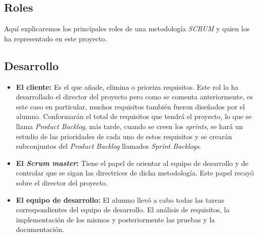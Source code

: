 \subsection*{Roles}
Aquí explicaremos los principales roles de una metodología \textit{SCRUM} y quien los ha representado en este proyecto.
\subsection*{Desarrollo}
\begin{itemize}
\item \textbf{El cliente:} Es el que añade, elimina o prioriza requisitos. Este rol lo ha desarrollado el director del proyecto pero como se comenta anteriormente, es este caso en particular, muchos requisitos también fueron diseñados por el alumno.
Conformarán el total de requisitos que tendrá el proyecto, lo que se llama \textit{Product Backlog}, más tarde, cuando se creen los \textit{sprints}, se hará un estudio de las prioridades de cada uno de estos requisitos y se crearán subconjuntos del \textit{Product Backlog} llamados \textit{Sprint Backlogs}.
\item \textbf{El \textit{Scrum master}:} Tiene el papel de orientar al equipo de desarrollo y de controlar que se sigan las directrices de dicha metodología. Este papel recayó sobre el director del proyecto.
\item \textbf{El equipo de desarrollo:} El alumno llevó a cabo todas las tareas correspondientes del equipo de desarrollo. El análisis de requisitos, la implementación de los mismos y posteriormente las pruebas y la documentación.
\end{itemize}
